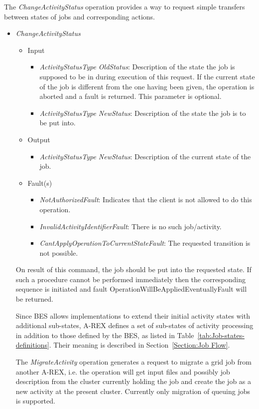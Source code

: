 \documentclass{article}                            %
\begin{document}
The \emph{ChangeActivityStatus} operation provides a way to request 
simple transfers between states of jobs and corresponding
actions.

\begin{itemize}
\item \emph{ChangeActivityStatus}
\begin{itemize}
\item Input
\begin{itemize}
\item \emph{ActivityStatusType OldStatus}: Description of the state the
job is supposed to be in during execution of this request. If the
current state of the job is different from the one having been given,
the operation is aborted and a fault is returned. This parameter is
optional.
\item \emph{ActivityStatusType NewStatus}: Description of the state the
job is to be put into.
\end{itemize}
\item Output
\begin{itemize}
\item \emph{ActivityStatusType NewStatus}: Description of the current state
of the job.
\end{itemize}
\item Fault(s)
\begin{itemize}
\item \emph{NotAuthorizedFault}: Indicates that the client is not allowed
to do this operation.
\item \emph{InvalidActivityIdentifierFault}: There is no such job/activity.
\item \emph{CantApplyOperationToCurrentStateFault}: The requested transition
is not possible.
\end{itemize}
\end{itemize}

On result of this command, the job should be put into the requested
state. If such a procedure cannot be performed immediately then the
corresponding sequence is initiated and fault 
OperationWillBeAppliedEventuallyFault will be returned.

Since BES allows implementations to extend their initial activity
states with additional sub-states, A-REX defines a set of sub-states
of activity processing in addition to those defined by the BES, as
listed in Table~\ref{tab:Job-states-definitions}. Their meaning is
described in Section~\ref{Section:Job Flow}.

The \emph{MigrateActivity} operation generates a request to migrate a 
grid job from another A-REX, i.e. the operation will get input 
files and possibly job description from the cluster currently holding 
the job and create the job as a new activity at the present cluster.
Currently only migration of queuing jobs is supported. 


\end{itemize}
\end{document}
